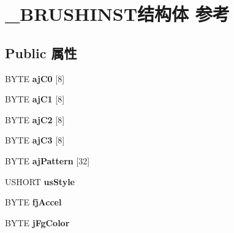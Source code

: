 \hypertarget{struct___b_r_u_s_h_i_n_s_t}{}\section{\+\_\+\+B\+R\+U\+S\+H\+I\+N\+S\+T结构体 参考}
\label{struct___b_r_u_s_h_i_n_s_t}
\subsection*{Public 属性}
\begin{DoxyCompactItemize}
\item 
\mbox{\label{struct___b_r_u_s_h_i_n_s_t_a4ff29f4f9a9143e7a2ed35e46a441229}} 
B\+Y\+TE {\bfseries aj\+C0} \mbox{[}8\mbox{]}
\item 
\mbox{\label{struct___b_r_u_s_h_i_n_s_t_a1b1492ae8fac501dc92e2380f4033ed7}} 
B\+Y\+TE {\bfseries aj\+C1} \mbox{[}8\mbox{]}
\item 
\mbox{\label{struct___b_r_u_s_h_i_n_s_t_aa7fc2f9535f5a2c0dfaddcb15ac5cefa}} 
B\+Y\+TE {\bfseries aj\+C2} \mbox{[}8\mbox{]}
\item 
\mbox{\label{struct___b_r_u_s_h_i_n_s_t_a65124019ffbbd1aa05157e5e7659df52}} 
B\+Y\+TE {\bfseries aj\+C3} \mbox{[}8\mbox{]}
\item 
\mbox{\label{struct___b_r_u_s_h_i_n_s_t_a3de9f0a4f7ab3392255983ef536fd032}} 
B\+Y\+TE {\bfseries aj\+Pattern} \mbox{[}32\mbox{]}
\item 
\mbox{\label{struct___b_r_u_s_h_i_n_s_t_afb9c0ca1e0d4135f6e1bede5546186ca}} 
U\+S\+H\+O\+RT {\bfseries us\+Style}
\item 
\mbox{\label{struct___b_r_u_s_h_i_n_s_t_a72b6566f39db7cf0e15491ed72fc6593}} 
B\+Y\+TE {\bfseries fj\+Accel}
\item 
\mbox{\label{struct___b_r_u_s_h_i_n_s_t_a82e1bc54bcdc0a2e4ce0eb42d8181f60}} 
B\+Y\+TE {\bfseries j\+Fg\+Color}
\item 
\mbox{\label{struct___b_r_u_s_h_i_n_s_t_a4c06f8841b7cba8e4c0bbd9e6e0af73b}} 

\end{DoxyCompactItemize}
